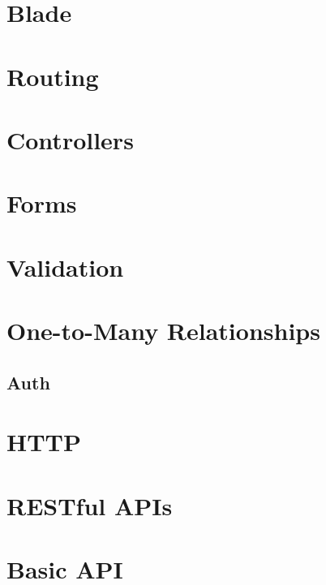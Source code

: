 \documentclass[b5paper,openany]{book}
\begin{document}
\chapter{Blade}


\chapter{Routing}


\chapter{Controllers}


\chapter{Forms}


\chapter{Validation}


\chapter{One-to-Many Relationships}


\begin{readonly}
    \chapter{Auth}
    
\end{readonly}

\chapter{HTTP}


\chapter{RESTful APIs}


\chapter{Basic API}

\end{document}
